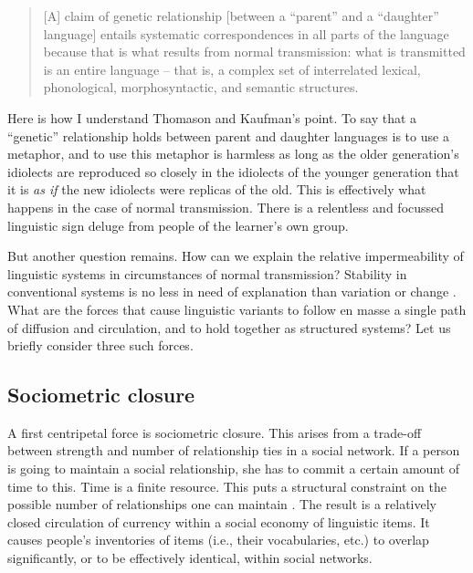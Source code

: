 \begin{quotation}
[A] claim of genetic relationship [between a ``parent'' and a ``daughter'' language] entails systematic correspondences in all parts of the language because that is what results from normal transmission: what is transmitted is an entire language -- that is, a complex set of interrelated lexical, phonological, morphosyntactic, and semantic structures. \citep[11]{thomason_language_1988}
\end{quotation}
	
Here is how I understand Thomason and Kaufman's point. To say that a ``genetic'' relationship holds between parent and daughter languages is to use a metaphor, and to use this metaphor is harmless as long as the older generation's idiolects are reproduced so closely in the idiolects of the younger generation that it is \textit{as if} the new idiolects were replicas of the old. This is effectively what happens in the case of normal transmission. There is a relentless and focussed linguistic sign deluge from people of the learner's own group.



But another question remains. How can we explain the relative impermeability of linguistic systems in circumstances of normal transmission? Stability in conventional systems is no less in need of 
explanation than variation or change \citep{bourdieu_outline_1977,sperber_explaining_1996,sperber_cognitive_2004}. What are the forces that cause linguistic variants to follow en masse a single path of diffusion 
and circulation, and to hold together as structured systems? Let us briefly 
consider three such forces.



\subsection{Sociometric closure}
\label{sociometricclosure}


A first centripetal force is sociometric closure. This arises from a trade-off between strength and number of relationship ties in a 
social network. If a person is going to maintain a social relationship, she 
has to commit a certain amount of time to this. Time is a 
finite resource. This puts a structural constraint on the possible 
number of relationships one can maintain \citep{hill_social_2003}. 
The result is a relatively closed circulation of currency within a 
social economy of linguistic items. It causes people's inventories of 
items (i.e., their vocabularies, etc.) to overlap significantly, or to 
be effectively identical, within social networks.



